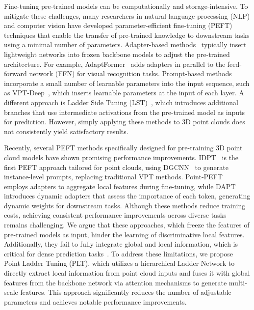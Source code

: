 Fine-tuning pre-trained models can be computationally and storage-intensive. To mitigate these challenges, many researchers in natural language processing (NLP) and computer vision have developed parameter-efficient fine-tuning (PEFT) techniques that enable the transfer of pre-trained knowledge to downstream tasks using a minimal number of parameters. Adapter-based methods~\cite{houlsby2019parameter, hu2021lora, chen2022adaptformer} typically insert lightweight networks into frozen backbone models to adjust the pre-trained architecture. For example, AdaptFormer~\cite{chen2022adaptformer} adds adapters in parallel to the feed-forward network (FFN) for visual recognition tasks. Prompt-based methods~\cite{li2021prefix, jia2022visual} incorporate a small number of learnable parameters into the input sequence, such as VPT-Deep~\cite{jia2022visual}, which inserts learnable parameters at the input of each layer. A different approach is Ladder Side Tuning (LST)~\cite{sung2022lst}, which introduces additional branches that use intermediate activations from the pre-trained model as inputs for prediction. However, simply applying these methods to 3D point clouds does not consistently yield satisfactory results.

Recently, several PEFT methods specifically designed for pre-training 3D point cloud models have shown promising performance improvements. IDPT~\cite{zha2023instance} is the first PEFT approach tailored for point clouds, using DGCNN~\cite{wang2019dynamic} to generate instance-level prompts, replacing traditional VPT methods. Point-PEFT~\cite{tang2024point} employs adapters to aggregate local features during fine-tuning, while DAPT~\cite{zhou2024dynamic} introduces dynamic adapters that assess the importance of each token, generating dynamic weights for downstream tasks. Although these methods reduce training costs, achieving consistent performance improvements across diverse tasks remains challenging. We argue that these approaches, which freeze the features of pre-trained models as input, hinder the learning of discriminative local features. Additionally, they fail to fully integrate global and local information, which is critical for dense prediction tasks~\cite{chen2022vitadapter}. To address these limitations, we propose Point Ladder Tuning (PLT), which utilizes a hierarchical Ladder Network to directly extract local information from point cloud inputs and fuses it with global features from the backbone network via attention mechanisms to generate multi-scale features. This approach significantly reduces the number of adjustable parameters and achieves notable performance improvements.
